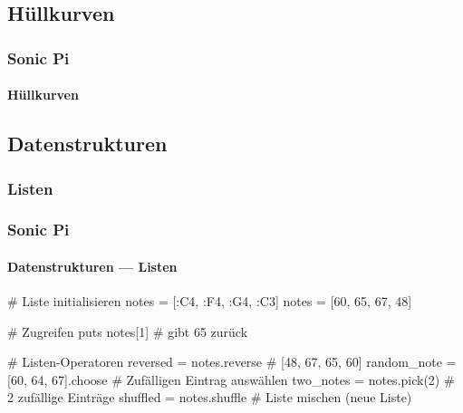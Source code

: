 \documentclass{beamer}
\begin{document}
\subsection{Hüllkurven}
\begin{frame}
  \frametitle{Sonic Pi}
  \framesubtitle{Hüllkurven}
  \centering
\end{frame}

\subsection{Datenstrukturen}
\subsubsection{Listen}
\begin{frame}[fragile]
  \frametitle{Sonic Pi}
  \framesubtitle{Datenstrukturen --- Listen}

  \begin{rubycode}
    # Liste initialisieren
    notes = [:C4, :F4, :G4, :C3]
    notes = [60, 65, 67, 48]

    # Zugreifen
    puts notes[1] # gibt 65 zurück

    # Listen-Operatoren
    reversed = notes.reverse          # [48, 67, 65, 60]
    random_note = [60, 64, 67].choose # Zufälligen Eintrag auswählen
    two_notes = notes.pick(2)         # 2 zufällige Einträge
    shuffled = notes.shuffle          # Liste mischen (neue Liste)

  \end{rubycode}
\end{frame}
\end{document}
